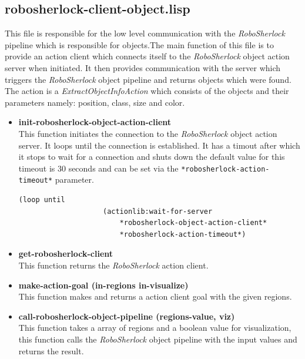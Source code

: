 \documentclass[main.tex]{subfiles}
\begin{document}
		\subsection{robosherlock-client-object.lisp}
		\label{object-perceive}
		This file is responsible for the low level communication with the \textit{RoboSherlock} pipeline which is responsible for objects.The main function of this file is to provide an action client which connects itself to the \textit{RoboSherlock} object action server when initiated. It then provides communication with the server which triggers the \textit{RoboSherlock} object pipeline and returns objects which were found. The action is a \textit{ExtractObjectInfoAction} which consists of the objects and their parameters namely: position, class, size and color.
		\begin{itemize}
			\item \textbf{init-robosherlock-object-action-client} \\
			This function initiates the connection to the \textit{RoboSherlock} object action server. It loops until the connection is established. It has a timout after which it stops to wait for a connection and shuts down the default value for this timeout is 30 seconds and can be set via the \texttt{*robosherlock-action-timeout*} parameter.
			\begin{lstlisting}[language={elisp}]
				(loop until 
					(actionlib:wait-for-server 
						*robosherlock-object-action-client*
						*robosherlock-action-timeout*)
			\end{lstlisting}
			\item \textbf{get-robosherlock-client} \\
			This function returns the \textit{RoboSherlock} action client.
			\item \textbf{make-action-goal (in-regions in-visualize)} \\
			This function makes and returns a action client goal with the given regions.
			\item \textbf{call-robosherlock-object-pipeline (regions-value, viz)} \\
			This function takes a array of regions and a boolean value for visualization, this function calls the \textit{RoboSherlock} object pipeline with the input values and returns the result.
		\end{itemize}
\end{document}
